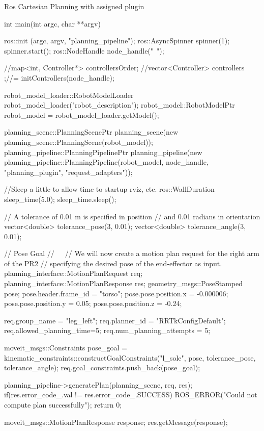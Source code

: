 Ros Cartesian Planning with assigned plugin \begin{DoxyVerb}int main(int argc, char **argv) {
    ros::init (argc, argv, "planning_pipeline");
    ros::AsyncSpinner spinner(1);
    spinner.start();
    ros::NodeHandle node_handle("~");

    //map<int, Controller*> controllersOrder;
    //vector<Controller>  controllers ;//= initControllers(node_handle);


    robot_model_loader::RobotModelLoader robot_model_loader("robot_description");
    robot_model::RobotModelPtr robot_model = robot_model_loader.getModel();

    planning_scene::PlanningScenePtr planning_scene(new planning_scene::PlanningScene(robot_model));
    planning_pipeline::PlanningPipelinePtr planning_pipeline(new planning_pipeline::PlanningPipeline(robot_model, node_handle, "planning_plugin", "request_adapters"));

    //Sleep a little to allow time to startup rviz, etc.
    ros::WallDuration sleep_time(5.0);
    sleep_time.sleep();

    // A tolerance of 0.01 m is specified in position
    // and 0.01 radians in orientation
    vector<double> tolerance_pose(3, 0.01);
    vector<double> tolerance_angle(3, 0.01);

    // Pose Goal
    // ^^^^^^^^^
    // We will now create a motion plan request for the right arm of the PR2
    // specifying the desired pose of the end-effector as input.
    planning_interface::MotionPlanRequest req;
    planning_interface::MotionPlanResponse res;
    geometry_msgs::PoseStamped pose;
    pose.header.frame_id = "torso";
    pose.pose.position.x = -0.000006;
    pose.pose.position.y = 0.05;
    pose.pose.position.z = -0.24;

    req.group_name = "leg_left";
    req.planner_id = "RRTkConfigDefault";
    req.allowed_planning_time=5;
    req.num_planning_attempts = 5;

    moveit_msgs::Constraints pose_goal = kinematic_constraints::constructGoalConstraints("l_sole", pose, tolerance_pose, tolerance_angle);
    req.goal_constraints.push_back(pose_goal);

    planning_pipeline->generatePlan(planning_scene, req, res);
    if(res.error_code_.val != res.error_code_.SUCCESS) {
        ROS_ERROR("Could not compute plan successfully");
        return 0;
    }

    moveit_msgs::MotionPlanResponse response;
    res.getMessage(response);

}
\end{DoxyVerb}
